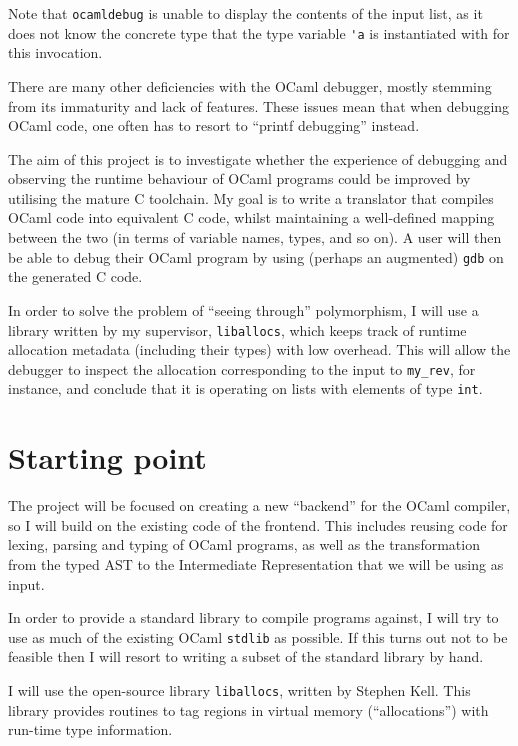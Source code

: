 \documentclass[12pt,twoside,a4paper]{article}
\begin{document}
Note that \lstinline{ocamldebug} is unable to display the contents of the input list, as it does not know the concrete type that the type variable \lstinline{'a} is instantiated with for this invocation.

There are many other deficiencies with the OCaml debugger, mostly stemming from its immaturity and lack of features. These issues mean that when debugging OCaml code, one often has to resort to ``printf debugging'' instead.

The aim of this project is to investigate whether the experience of debugging and observing the runtime behaviour of OCaml programs could be improved by utilising the mature C toolchain. My goal is to write a translator that compiles OCaml code into equivalent C code, whilst maintaining a well-defined mapping between the two (in terms of variable names, types, and so on). A user will then be able to debug their OCaml program by using (perhaps an augmented) \lstinline{gdb} on the generated C code.

In order to solve the problem of ``seeing through'' polymorphism, I will use a library written by my supervisor, \lstinline{liballocs}, which keeps track of runtime allocation metadata (including their types) with low overhead. This will allow the debugger to inspect the allocation corresponding to the input to \lstinline{my_rev}, for instance, and conclude that it is operating on lists with elements of type \lstinline{int}.


\section*{Starting point}

The project will be focused on creating a new ``backend'' for the OCaml
compiler, so I will build on the existing code of the frontend.
This includes reusing code for lexing, parsing and typing of OCaml programs, as
well as the transformation from the typed AST to the Intermediate
Representation that we will be using as input.

In order to provide a standard library to compile programs against, I will try
to use as much of the existing OCaml \lstinline{stdlib} as possible. If this
turns out not to be feasible then I will resort to writing a subset of the
standard library by hand.

I will use the open-source library \lstinline{liballocs}, written by Stephen Kell.
This library provides routines to tag regions in virtual memory
(``allocations'') with run-time type information.
\end{document}
